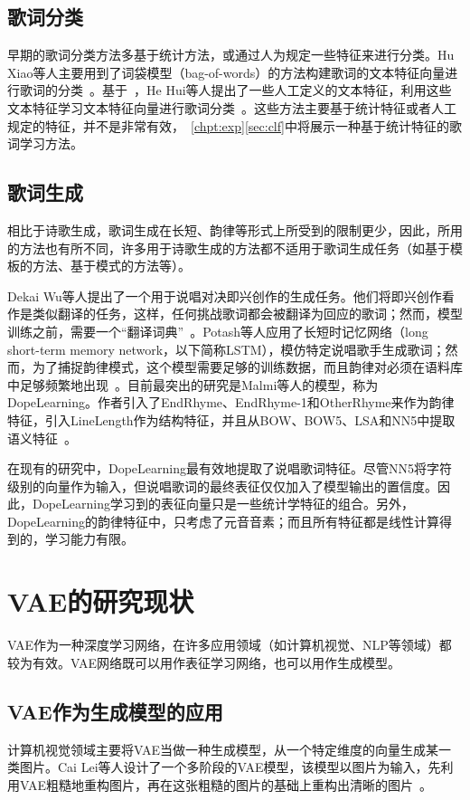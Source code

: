 \subsection{歌词分类}
早期的歌词分类方法多基于统计方法，或通过人为规定一些特征来进行分类。Hu Xiao等人主要用到了词袋模型（bag-of-words）的方法构建歌词的文本特征向量进行歌词的分类~\cite{hu2009lyric}。基于~\cite{hu2009lyric}，He Hui等人提出了一些人工定义的文本特征，利用这些文本特征学习文本特征向量进行歌词分类~\cite{he2008language}。这些方法主要基于统计特征或者人工规定的特征，并不是非常有效，~\ref{chpt:exp}\ref{sec:clf}中将展示一种基于统计特征的歌词学习方法。

\subsection{歌词生成}
相比于诗歌生成，歌词生成在长短、韵律等形式上所受到的限制更少，因此，所用的方法也有所不同，许多用于诗歌生成的方法都不适用于歌词生成任务（如基于模板的方法、基于模式的方法等）。\par

Dekai Wu等人提出了一个用于说唱对决即兴创作的生成任务。他们将即兴创作看作是类似翻译的任务，这样，任何挑战歌词都会被翻译为回应的歌词；然而，模型训练之前，需要一个“翻译词典”~\cite{wu2013learning}。Potash等人应用了长短时记忆网络（long short-term memory network，以下简称LSTM），模仿特定说唱歌手生成歌词；然而，为了捕捉韵律模式，这个模型需要足够的训练数据，而且韵律对必须在语料库中足够频繁地出现~\cite{Potash2015GhostWriter}。目前最突出的研究是Malmi等人的模型，称为DopeLearning。作者引入了EndRhyme、EndRhyme-1和OtherRhyme来作为韵律特征，引入LineLength作为结构特征，并且从BOW、BOW5、LSA和NN5中提取语义特征~\cite{Malmi2016dopelearning}。\par

在现有的研究中，DopeLearning最有效地提取了说唱歌词特征。尽管NN5将字符级别的向量作为输入，但说唱歌词的最终表征仅仅加入了模型输出的置信度。因此，DopeLearning学习到的表征向量只是一些统计学特征的组合。另外，DopeLearning的韵律特征中，只考虑了元音音素；而且所有特征都是线性计算得到的，学习能力有限。\par

\section{VAE的研究现状}
VAE作为一种深度学习网络，在许多应用领域（如计算机视觉、NLP等领域）都较为有效。VAE网络既可以用作表征学习网络，也可以用作生成模型。\par

\subsection{VAE作为生成模型的应用}
计算机视觉领域主要将VAE当做一种生成模型，从一个特定维度的向量生成某一类图片。Cai Lei等人设计了一个多阶段的VAE模型，该模型以图片为输入，先利用VAE粗糙地重构图片，再在这张粗糙的图片的基础上重构出清晰的图片~\cite{cai2017multi}。\par

